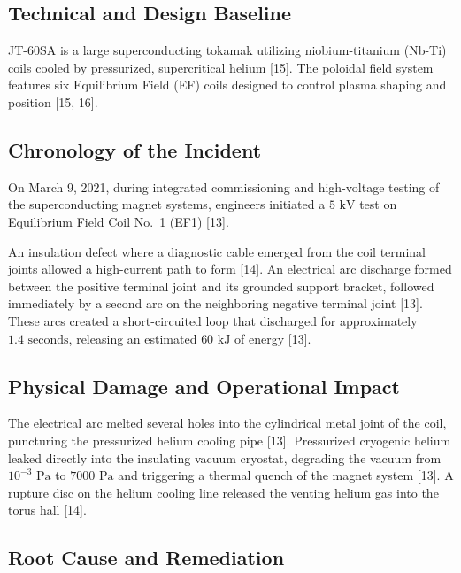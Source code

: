 \documentclass[11pt,a4paper]{article}
\begin{document}
\hypertarget{technical-and-design-baseline-5}{%
\subsection{Technical and Design Baseline}\label{technical-and-design-baseline-5}}

JT-60SA is a large superconducting tokamak utilizing niobium-titanium (Nb-Ti) coils cooled by pressurized, supercritical helium {[}15{]}. The poloidal field system features six Equilibrium Field (EF) coils designed to control plasma shaping and position {[}15, 16{]}.

\hypertarget{chronology-of-the-incident-5}{%
\subsection{Chronology of the Incident}\label{chronology-of-the-incident-5}}

On March 9, 2021, during integrated commissioning and high-voltage testing of the superconducting magnet systems, engineers initiated a \(5\text{ kV}\) test on Equilibrium Field Coil No.~1 (EF1) {[}13{]}.

An insulation defect where a diagnostic cable emerged from the coil terminal joints allowed a high-current path to form {[}14{]}. An electrical arc discharge formed between the positive terminal joint and its grounded support bracket, followed immediately by a second arc on the neighboring negative terminal joint {[}13{]}. These arcs created a short-circuited loop that discharged for approximately \(1.4\text{ seconds}\), releasing an estimated \(60\text{ kJ}\) of energy {[}13{]}.

\hypertarget{physical-damage-and-operational-impact-5}{%
\subsection{Physical Damage and Operational Impact}\label{physical-damage-and-operational-impact-5}}

The electrical arc melted several holes into the cylindrical metal joint of the coil, puncturing the pressurized helium cooling pipe {[}13{]}. Pressurized cryogenic helium leaked directly into the insulating vacuum cryostat, degrading the vacuum from \(10^{-3}\text{ Pa}\) to \(7000\text{ Pa}\) and triggering a thermal quench of the magnet system {[}13{]}. A rupture disc on the helium cooling line released the venting helium gas into the torus hall {[}14{]}.

\hypertarget{root-cause-and-remediation-5}{%
\subsection{Root Cause and Remediation}\label{root-cause-and-remediation-5}}
\end{document}
